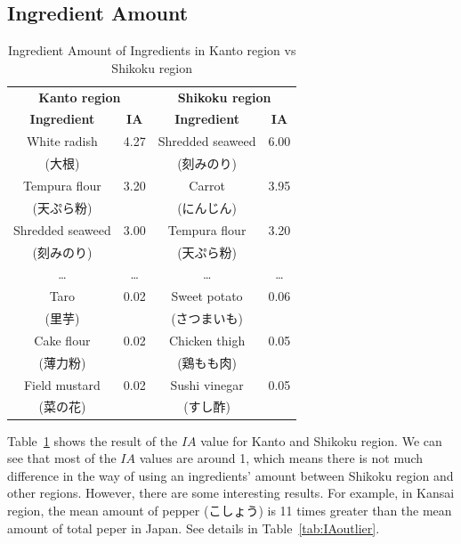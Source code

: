 \documentclass{sig-alternate}
\begin{document}
\subsection{Ingredient Amount}

\begin{CJK}{UTF8}{min}

\begin{table}

\centering
\caption{Ingredient Amount of Ingredients in Kanto region vs Shikoku region}
\begin{tabular}{|c|c|c|c|}
\hline
\multicolumn{2}{|c|}{\textbf{\large Kanto region}} & \multicolumn{2}{|c|}{\textbf{\large Shikoku region}} \\
\cline{1-4}

\textbf{Ingredient} &	\textbf{IA} &\textbf{Ingredient} & \textbf{IA}\\ \hline
White radish & 4.27 &  Shredded seaweed& 6.00 \\
(大根)	& &  (刻みのり)  & \\ \hline
Tempura flour 	& 3.20  & Carrot& 3.95 \\
(天ぷら粉)  & &  (にんじん) & \\ \hline
 Shredded seaweed 		& 3.00 & Tempura flour & 3.20\\
(刻みのり) & &  (天ぷら粉)  & \\ \hline
\ldots &\ldots & \ldots & \ldots \\ \hline
Taro 	& 0.02& Sweet potato &0.06 \\ 
 (里芋)	&  &  (さつまいも) & \\ \hline
Cake flour	& 0.02& Chicken thigh&0.05\\ 
 (薄力粉) & &  (鶏もも肉) & \\ \hline
Field mustard	& 0.02& Sushi vinegar & 0.05\\
 (菜の花)  & & (すし酢) & \\ \hline

\end{tabular}

\label{tab:IA}
\end{table} 
 
Table~\ref{tab:IA} shows the result of the $IA$ value for Kanto and Shikoku region. We can see that most of the $IA$ values are around 1, which means there is not much difference in the way of using an ingredients' amount between Shikoku region and other regions. However, there are some interesting results. For example, in Kansai region, the mean amount of pepper (こしょう) is 11 times greater than the mean amount of total peper in Japan. See details in Table~\ref{tab:IAoutlier}. 





\end{CJK}
\end{document}
